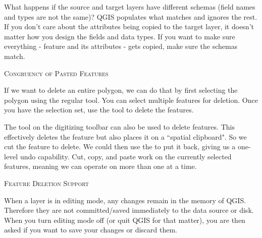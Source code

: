 What happens if the source and target layers have
different schemas (field names and types are not the same)? QGIS populates
what matches and ignores the rest. If you don't care about the attributes
being copied to the target layer, it doesn't matter how you design the
fields and data types. If you want to make sure everything - feature and its
attributes - gets copied, make sure the schemas match.

\begin{Tip}[ht]\caption{\textsc{Congruency of Pasted Features}}
\end{Tip}


If we want to delete an entire polygon, we can do that by first selecting 
the polygon using the regular  tool. You can select 
multiple features for deletion. Once you have the selection set, use the 
 tool to delete the features. 

The  tool on the digitizing toolbar can
also be used to delete features. This effectively deletes the feature but
also places it on a ``spatial clipboard". So we cut the feature to delete. 
We could then use the  to put it back, giving us a one-level undo 
capability. Cut, copy, and paste work on the currently selected features, 
meaning we can operate on more than one at a time.

\begin{Tip}[ht]\caption{\textsc{Feature Deletion Support}}
\end{Tip}


When a layer is in editing mode, any changes remain in the memory of QGIS.
Therefore they are not committed/saved immediately to the data source or disk.
When you turn editing mode off (or quit QGIS for that matter), 
you are then asked if you want to save your
changes or discard them.

